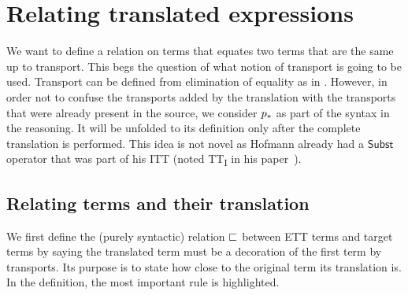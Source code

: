 \chapter{Relating translated expressions}

We want to define a relation on terms that equates two terms that are
the same up to transport.
%
This begs the question of what notion of transport is going to be
used.
%
Transport can be defined from elimination of equality as in .
However, in order not to confuse the transports added by the
translation with the transports that were already present in the
source, we consider $p_*$ as part of the syntax in the
reasoning. It will be unfolded to its definition only after the
complete translation is performed.
%
This idea is not novel as Hofmann already had a $\mathsf{Subst}$ operator that
was part of his \acrshort{ITT} (noted TT\textsubscript{I} in his
paper~).

\section{Relating terms and their translation}

We first define the (purely syntactic) relation $\sqsubset$ between \acrshort{ETT}
terms and target terms by saying the translated term must be a decoration of the
first term by transports.
Its purpose is to state how close to the original term its translation is.
In the definition, the most important rule is highlighted.

